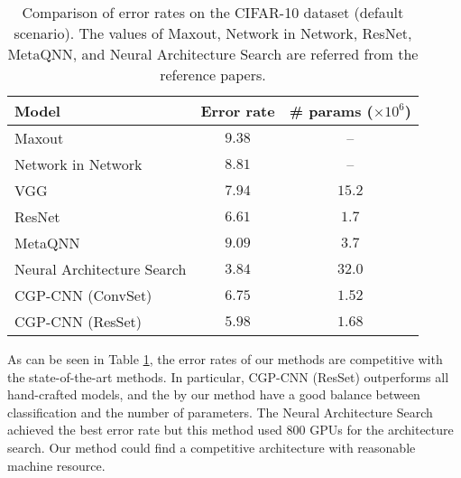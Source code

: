 \begin{table}[t]
  \caption{Comparison of error rates on the CIFAR-10 dataset (default scenario). The values of Maxout, Network in Network, ResNet, MetaQNN, and Neural Architecture Search are referred from the reference papers.}
  \label{results}
  \begin{tabular}{l|c|c} \hline
   Model & Error rate & \# params ($\times 10^6$) \\ \hline
   Maxout \cite{goodfellow_maxout_2013} & $9.38$ & -- \\ 
   Network in Network \cite{lin_network_2014} & $8.81$ & -- \\
   VGG \cite{simonyan_very_2014} \footnotemark & $7.94$ & $15.2$ \\
   ResNet \cite{he_deep_2016} & $6.61$ & $1.7$ \\
   MetaQNN \cite{baker_designing_2016} \footnotemark & $9.09$ & $3.7$ \\
   Neural Architecture Search \cite{zoph_neural_2016} & $3.84$ & $32.0$ \\
   CGP-CNN (ConvSet) & $6.75$ & $1.52$ \\
   CGP-CNN (ResSet) & $5.98$ & $1.68$ \\ \hline
  \end{tabular}
\end{table}

As can be seen in Table \ref{results}, the error rates of our methods are competitive with the state-of-the-art methods.
In particular, CGP-CNN (ResSet) outperforms all hand-crafted models, and the  by  our method have a good balance between classification  and the number of parameters. The Neural Architecture Search achieved the best error rate\new{,} but this method used 800 GPUs for the architecture search. Our method could find a competitive architecture with  reasonable machine resource.

